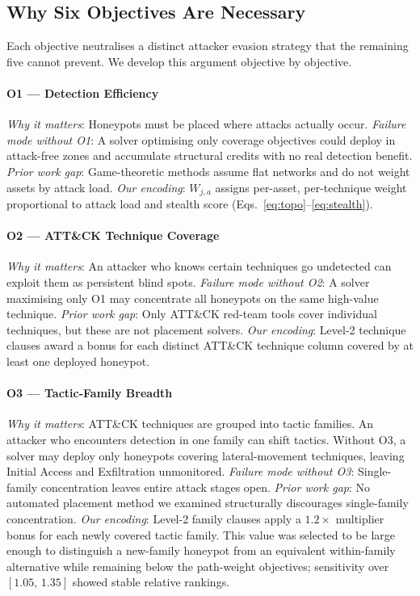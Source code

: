 \documentclass[journal]{IEEEtran}
\begin{document}
\subsection{Why Six Objectives Are Necessary}
\label{sec:model:objectives}

Each objective neutralises a distinct attacker evasion strategy that
the remaining five cannot prevent. We develop this argument objective
by objective.

\paragraph{O1 --- Detection Efficiency}
\emph{Why it matters}: Honeypots must be placed where attacks actually
occur.
\emph{Failure mode without O1}: A solver optimising only coverage
objectives could deploy in attack-free zones and accumulate structural
credits with no real detection benefit.
\emph{Prior work gap}: Game-theoretic methods assume flat networks and
do not weight assets by attack load.
\emph{Our encoding}: $W_{j,a}$ assigns per-asset, per-technique weight
proportional to attack load and stealth score
(Eqs.~\ref{eq:topo}--\ref{eq:stealth}).

\paragraph{O2 --- ATT\&CK Technique Coverage}
\emph{Why it matters}: An attacker who knows certain techniques go
undetected can exploit them as persistent blind spots.
\emph{Failure mode without O2}: A solver maximising only O1 may
concentrate all honeypots on the same high-value technique.
\emph{Prior work gap}: Only ATT\&CK red-team tools cover individual
techniques, but these are not placement solvers.
\emph{Our encoding}: Level-2 technique clauses award a bonus for each
distinct ATT\&CK technique column covered by at least one deployed
honeypot.

\paragraph{O3 --- Tactic-Family Breadth}
\emph{Why it matters}: ATT\&CK techniques are grouped into tactic
families. An attacker who encounters detection in one family can shift
tactics. Without O3, a solver may deploy only honeypots covering
lateral-movement techniques, leaving Initial Access and Exfiltration
unmonitored.
\emph{Failure mode without O3}: Single-family concentration leaves
entire attack stages open.
\emph{Prior work gap}: No automated placement method we examined
structurally discourages single-family concentration.
\emph{Our encoding}: Level-2 family clauses apply a $1.2\times$
multiplier bonus for each newly covered tactic family. This value was
selected to be large enough to distinguish a new-family honeypot from
an equivalent within-family alternative while remaining below the
path-weight objectives; sensitivity over $[1.05,\,1.35]$ showed
stable relative rankings.
\end{document}
